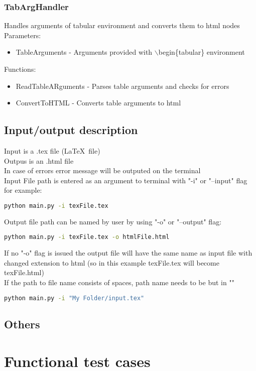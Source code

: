 \documentclass[12pt]{article}
\begin{document}
\subsubsection{TabArgHandler}
Handles arguments of tabular environment and converts them to html nodes  \\ 
Parameters: \\ 
\begin{itemize}
\item TableArguments - Arguments provided with $\backslash$begin\{tabular\} environment
\end{itemize}
Functions: 
\begin{itemize}
    \item ReadTableARguments - Parses table arguments and checks for errors 
    \item ConvertToHTML - Converts table arguments to html
\end{itemize}

\subsection{Input/output description}
Input is a .tex file (\LaTeX \, file) \\ 
Outpus is an .html file \\ 
In case of errors error message will be outputed on the terminal \\
Input File path is entered as an argument to terminal with "-i" or "--input" flag for example:
\begin{lstlisting}[language=bash]
python main.py -i texFile.tex
\end{lstlisting}
Output file path can be named by user by using "-o" or "--output" flag:
\begin{lstlisting}[language=bash]
python main.py -i texFile.tex -o htmlFile.html
\end{lstlisting}
If no "-o" flag is issued the output file will have the same name as input file with changed extension to html (so in this example texFile.tex will become texFile.html) \\ 
If the path to file name consists of spaces, path name needs to be but in ""
\begin{lstlisting}[language=bash]
python main.py -i "My Folder/input.tex"
\end{lstlisting}
\subsection{Others}
\section{Functional test cases}
\end{document}
